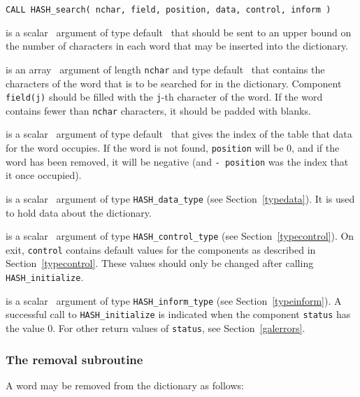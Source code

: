 \documentclass{galahad}
\newcommand{\packagename}{HASH}
\begin{document}
\hspace{8mm}
{\tt CALL \packagename\_search( nchar, field, position, data, control, inform )}

\vspace*{-2mm}
\begin{description}

 is a scalar \intentin\ argument of type default \integer\ that
should be sent to an upper bound on the number of characters in each
word that may be inserted into the dictionary.

 is an array \intentin\ argument of length {\tt nchar} and 
type default \character\ that contains the characters of the word that 
is to be searched for in the dictionary.  
Component {\tt field(j)} should be filled with the {\tt j}-th 
character of the word. If the word contains fewer than {\tt nchar} characters,
it should be padded with blanks.

 is a scalar \intentout\ argument of type default \integer\ that
gives the index of the table that data for the word occupies. If the word is
not found, {\tt position} will be 0, and if the word has been removed, it will
be negative (and {\tt - position} was the index that it once occupied).

 is a scalar \intentinout\ argument of type
{\tt \packagename\_data\_type}
(see Section~\ref{typedata}). It is used to hold data about the dictionary.

 is a scalar \intentin\ argument of type
{\tt \packagename\_control\_type}
(see Section~\ref{typecontrol}).
On exit, {\tt control} contains default values for the components as
described in Section~\ref{typecontrol}.
These values should only be changed after calling
{\tt \packagename\_initialize}.

 is a scalar \intentinout\ argument of type
{\tt \packagename\_inform\_type}
(see Section~\ref{typeinform}). A successful call to
{\tt \packagename\_initialize}
is indicated when the  component {\tt status} has the value 0.
For other return values of {\tt status}, see Section~\ref{galerrors}.

\end{description}


\subsubsection{The removal subroutine}\label{subremove}
A word may be removed from the dictionary as follows:
\vspace*{1mm}
\end{document}
